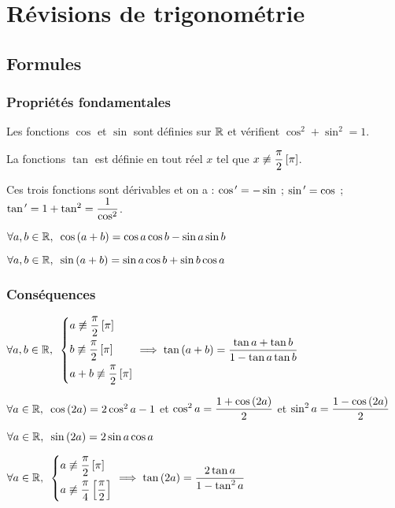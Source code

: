 \chapter{Révisions de trigonométrie}

\minitoc

\section{Formules}

\subsection{Propriétés fondamentales}

Les fonctions \(\cos\) et \(\sin\) sont définies sur \(\mathbb{R}\) et vérifient \(\cos^2+\sin^2=1\).

La fonctions \(\tan\) est définie en tout réel \(x\) tel que \(x\not\equiv\dfrac{\pi}{2}\left[\pi\right]\).

Ces trois fonctions sont dérivables et on a : \(\cos^{\,\prime}=-\sin\) ; \(\sin^{\,\prime}=\cos\) ; \(\tan^{\,\prime}=1+\tan^2=\dfrac{1}{\cos^2}\).

\(\quantifs{\forall a,b\in\R}\cos\paren{a+b}=\cos a\cos b-\sin a\sin b\)

\(\quantifs{\forall a,b\in\R}\sin\paren{a+b}=\sin a\cos b+\sin b\cos a\)

\subsection{Conséquences}

\(\quantifs{\forall a,b\in\R}\begin{dcases}a\not\equiv\dfrac{\pi}{2}\croch{\pi} \\ b\not\equiv\dfrac{\pi}{2}\croch{\pi} \\ a+b\not\equiv\dfrac{\pi}{2}\croch{\pi}\end{dcases}\imp\tan\paren{a+b}=\dfrac{\tan a+\tan b}{1-\tan a\tan b}\)

\(\quantifs{\forall a\in\R}\cos\paren{2a}=2\cos^2a-1\) et \(\cos^2a=\dfrac{1+\cos\left(2a\right)}{2}\) et \(\sin^2a=\dfrac{1-\cos\left(2a\right)}{2}\)

\(\quantifs{\forall a\in\R}\sin\paren{2a}=2\sin a\cos a\)

\(\quantifs{\forall a\in\R}\begin{dcases}a\not\equiv\dfrac{\pi}{2}\croch{\pi} \\ a\not\equiv\dfrac{\pi}{4}\croch{\dfrac{\pi}{2}}\end{dcases}\imp\tan\paren{2a}=\dfrac{2\tan a}{1-\tan^2a}\)

